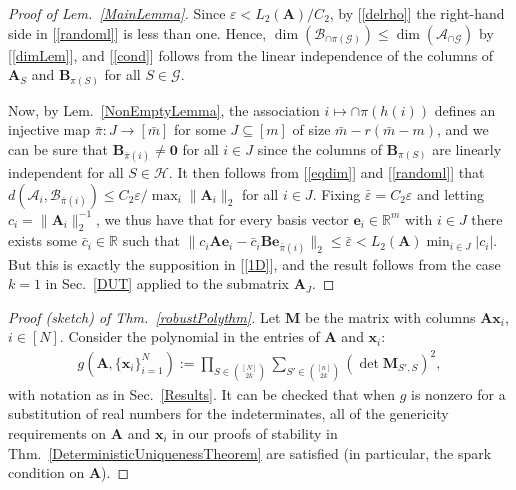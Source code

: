 \documentclass[9pt,twocolumn]{pnas-new}
\renewcommand{\eqref}[1]{\textnormal{[\ref{#1}]}}
\begin{document}
\begin{proof}[Proof of Lem.~\ref{MainLemma}]
Since $\varepsilon < L_2(\mathbf{A}) / C_2$, by \eqref{delrho} the right-hand side in \eqref{randoml} is less than one. Hence, $\dim(\bm{\mathcal{B}}_{\cap \pi(\mathcal{G})}) \leq \dim(\bm{\mathcal{A}}_{\cap \mathcal{G}})$ by \eqref{dimLem}, and \eqref{cond} follows from the linear independence of the columns of $\mathbf{A}_{S}$ and $\mathbf{B}_{\pi(S)}$ for all $S \in \mathcal{G}$.

Now, by Lem.~\ref{NonEmptyLemma}, the association $i \mapsto \cap \pi(h(i))$ defines an injective map $\bar \pi: J \to [\bar m]$ for some $J \subseteq [m]$ of size $\bar m - r(\bar m - m)$, and we can be sure that $\mathbf{B}_{\bar \pi(i)} \neq \mathbf{0}$ for all $i \in J$ since the columns of $\mathbf{B}_{\pi(S)}$ are linearly independent for all $S \in \mathcal{H}$. It then follows from \eqref{eqdim} and \eqref{randoml} that $d\left( \bm{\mathcal{A}}_i, \bm{\mathcal{B}}_{\bar \pi(i)} \right) \leq C_2 \varepsilon / \max_i \|\mathbf{A}_i\|_2$ for all $i \in J$. Fixing $\bar \varepsilon = C_2\varepsilon$ and letting $c_i = \|\mathbf{A}_i\|_2^{-1}$, we thus have that for every basis vector $\mathbf{e}_i \in \mathbb{R}^m$ with $i \in J$ there exists some $\bar{c}_i \in \mathbb{R}$ such that $\|c_i\mathbf{A}\mathbf{e}_i - \bar{c}_i \mathbf{B}\mathbf{e}_{\bar \pi(i)}\|_2 \leq \bar \varepsilon < L_2(\mathbf{A}) \min_{i\in J} |c_i|$.  But this is exactly the supposition in \eqref{1D}, and the result follows from the case $k=1$ in Sec.~\ref{DUT} applied to the submatrix $\mathbf{A}_J$.
\end{proof}


\begin{proof}[Proof (sketch) of Thm.~\ref{robustPolythm}]
Let $\textbf{M}$ be the matrix with columns $\mathbf{A}\mathbf{x}_i$, $i \in [N]$.  Consider the polynomial in the entries of $\mathbf{A}$ and $\mathbf{x}_i$:
\begin{align*}
g(\mathbf{A}, \{\mathbf{x}_i\}_{i=1}^N) := \prod_{S \in {[N] \choose 2k}} \sum_{S' \in {[n] \choose 2k}} (\det \textbf{M}_{S',S})^2,
\end{align*}
with notation as in Sec.~\ref{Results}.  
It can be checked that when $g$ is nonzero for a substitution of real numbers for the indeterminates, all of the genericity requirements on $\mathbf{A}$ and $\mathbf{x}_i$ in our proofs of stability in Thm.~\ref{DeterministicUniquenessTheorem} are satisfied (in particular, the spark condition on $\mathbf{A}$).
\end{proof}
\end{document}
